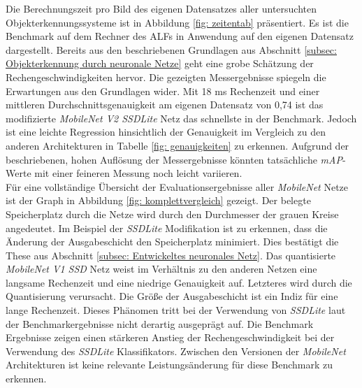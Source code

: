 Die Berechnungszeit pro Bild des eigenen Datensatzes aller untersuchten Objekterkennungssysteme ist in Abbildung \ref{fig: zeitentab} präsentiert. Es ist die Benchmark auf dem Rechner des ALFs in Anwendung auf den eigenen Datensatz dargestellt. Bereits aus den beschriebenen Grundlagen aus Abschnitt \ref{subsec: Objekterkennung durch neuronale Netze} geht eine grobe Schätzung der Rechengeschwindigkeiten hervor. Die gezeigten Messergebnisse spiegeln die Erwartungen aus den Grundlagen wider. Mit 18 ms Rechenzeit und einer mittleren Durchschnittsgenauigkeit am eigenen Datensatz von 0,74 ist das modifizierte \textit{MobileNet V2 SSDLite} Netz das schnellste in der Benchmark. Jedoch ist eine leichte Regression hinsichtlich der Genauigkeit im Vergleich zu den anderen Architekturen in Tabelle \ref{fig: genauigkeiten} zu erkennen. Aufgrund der beschriebenen, hohen Auflösung der Messergebnisse könnten tatsächliche \textit{mAP}-Werte mit einer feineren Messung noch leicht variieren.    \\  

Für eine vollständige Übersicht der Evaluationsergebnisse aller \textit{MobileNet} Netze ist der Graph in Abbildung \ref{fig: komplettvergleich} gezeigt. Der belegte Speicherplatz durch die Netze wird durch den Durchmesser der grauen Kreise angedeutet. Im Beispiel der \textit{SSDLite} Modifikation ist zu erkennen, dass die Änderung der Ausgabeschicht den Speicherplatz minimiert. Dies bestätigt die These aus Abschnitt \ref{subsec: Entwickeltes neuronales Netz}. Das quantisierte \textit{MobileNet V1 SSD} Netz weist im Verhältnis zu den anderen Netzen eine langsame Rechenzeit und eine niedrige Genauigkeit auf. Letzteres wird durch die Quantisierung verursacht. Die Größe der Ausgabeschicht ist ein Indiz für eine lange Rechenzeit. Dieses Phänomen tritt bei der Verwendung von \textit{SSDLite} laut der Benchmarkergebnisse nicht derartig ausgeprägt auf. Die Benchmark Ergebnisse zeigen einen stärkeren Anstieg der Rechengeschwindigkeit bei der Verwendung des \textit{SSDLite} Klassifikators. Zwischen den Versionen der \textit{MobileNet} Architekturen ist keine relevante Leistungsänderung für diese Benchmark zu erkennen. 



